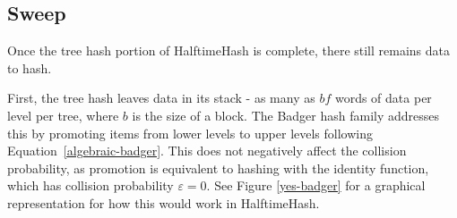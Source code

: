 \documentclass[runningheads]{llncs}
\begin{document}



\subsection{Sweep}


Once the tree hash portion of HalftimeHash is complete, there still remains data to hash.

First, the tree hash leaves data in its stack - as many as $bf$ words of data per level per tree, where $b$ is the size of a block.
The Badger hash family addresses this by promoting items from lower levels to upper levels following Equation~\ref{algebraic-badger}.
This does not negatively affect the collision probability, as promotion is equivalent to hashing with the identity function, which has collision probability $\varepsilon = 0$.
See Figure \ref{yes-badger} for a graphical representation for how this would work in HalftimeHash.
\end{document}
